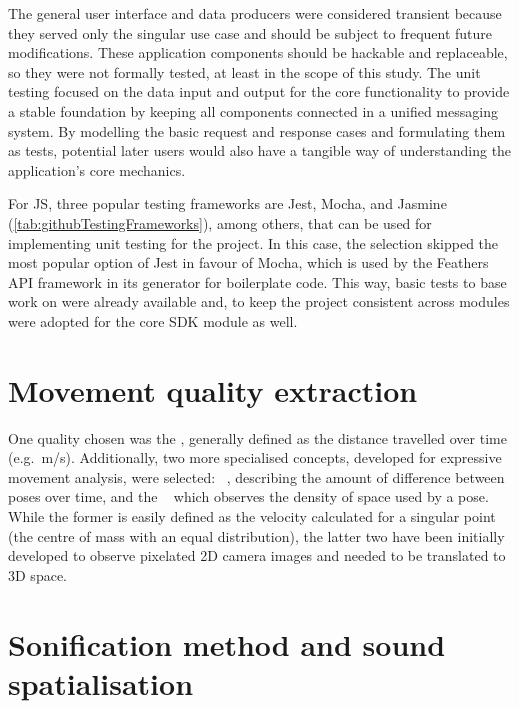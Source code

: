 The general user interface and data producers were considered transient because they served only the singular use case and should be subject to frequent future modifications.
These application components should be hackable and replaceable, so they were not formally tested, at least in the scope of this study.
The unit testing focused on the data input and output for the core functionality to provide a stable foundation by keeping all components connected in a unified messaging system.
By modelling the basic request and response cases and formulating them as tests, potential later users would also have a tangible way of understanding the application's core mechanics.

For \ac{JS}, three popular testing frameworks are Jest, Mocha, and Jasmine (\ref{tab:githubTestingFrameworks}), among others, that can be used for implementing unit testing for the project.
In this case, the selection skipped the most popular option of Jest in favour of Mocha, which is used by the Feathers \ac{API} framework in its generator for boilerplate code.
This way, basic tests to base work on were already available and, to keep the project consistent across modules were adopted for the core \ac{SDK} module as well.



\section{Movement quality extraction}

One quality chosen was the , generally defined as the distance travelled over time (e.g.\ m/s).
Additionally, two more specialised concepts, developed for expressive movement analysis, were selected: ~\parencite[96-97]{movementQualities}, describing the amount of difference between poses over time, and the ~\parencite[97]{movementQualities} which observes the density of space used by a pose.
While the former is easily defined as the velocity calculated for a singular point (the centre of mass with an equal distribution), the latter two have been initially developed to observe pixelated \ac{2D} camera images and needed to be translated to \ac{3D} space.

\section{Sonification method and sound spatialisation}

